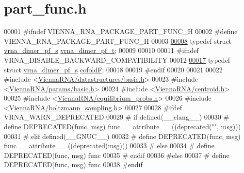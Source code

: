 \hypertarget{part__func_8h_source}{}\section{part\+\_\+func.\+h}
\label{part__func_8h_source}

\begin{DoxyCode}
00001 \textcolor{preprocessor}{#ifndef VIENNA\_RNA\_PACKAGE\_PART\_FUNC\_H}
00002 \textcolor{preprocessor}{#define VIENNA\_RNA\_PACKAGE\_PART\_FUNC\_H}
00003 
\hyperlink{group__pf__cofold_ga444df1587c9a2ca15b8eb25188f629c3}{00008} \textcolor{keyword}{typedef} \textcolor{keyword}{struct }\hyperlink{group__part__func__global_structvrna__dimer__pf__s}{vrna\_dimer\_pf\_s} \hyperlink{group__part__func__global_structvrna__dimer__pf__s}{vrna\_dimer\_pf\_t};
00009 
00010 
00011 \textcolor{preprocessor}{#ifndef VRNA\_DISABLE\_BACKWARD\_COMPATIBILITY}
00012 
\hyperlink{group__pf__cofold_ga5445d8d96a40e9e79b1fa5a7f1a6b7ea}{00017} \textcolor{keyword}{typedef} \textcolor{keyword}{struct }\hyperlink{group__part__func__global_structvrna__dimer__pf__s}{vrna\_dimer\_pf\_s} \hyperlink{group__part__func__global_structvrna__dimer__pf__s}{cofoldF};
00018 
00019 \textcolor{preprocessor}{#endif}
00020 
00021 
00022 \textcolor{preprocessor}{#include <\hyperlink{datastructures_2basic_8h}{ViennaRNA/datastructures/basic.h}>}
00023 \textcolor{preprocessor}{#include <\hyperlink{params_2basic_8h}{ViennaRNA/params/basic.h}>}
00024 \textcolor{preprocessor}{#include <\hyperlink{centroid_8h}{ViennaRNA/centroid.h}>}
00025 \textcolor{preprocessor}{#include <\hyperlink{equilibrium__probs_8h}{ViennaRNA/equilibrium\_probs.h}>}
00026 \textcolor{preprocessor}{#include <\hyperlink{boltzmann__sampling_8h}{ViennaRNA/boltzmann\_sampling.h}>}
00027 
00028 \textcolor{preprocessor}{#ifdef VRNA\_WARN\_DEPRECATED}
00029 \textcolor{preprocessor}{# if defined(\_\_clang\_\_)}
00030 \textcolor{preprocessor}{#  define DEPRECATED(func, msg) func \_\_attribute\_\_ ((deprecated("", msg)))}
00031 \textcolor{preprocessor}{# elif defined(\_\_GNUC\_\_)}
00032 \textcolor{preprocessor}{#  define DEPRECATED(func, msg) func \_\_attribute\_\_ ((deprecated(msg)))}
00033 \textcolor{preprocessor}{# else}
00034 \textcolor{preprocessor}{#  define DEPRECATED(func, msg) func}
00035 \textcolor{preprocessor}{# endif}
00036 \textcolor{preprocessor}{#else}
00037 \textcolor{preprocessor}{# define DEPRECATED(func, msg) func}
00038 \textcolor{preprocessor}{#endif}

\end{DoxyCode}

